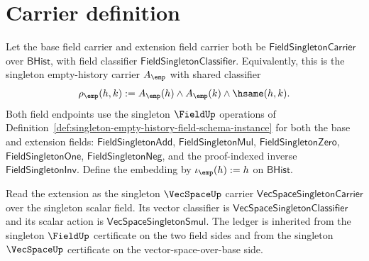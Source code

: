 \section{Carrier definition}
\label{sec:fieldext-carrier}

\begin{definition}
\label{def:fieldext-singleton-empty-history-instance}
Let the base field carrier and extension field carrier both be
$\mathsf{FieldSingletonCarrier}$ over $\mathsf{BHist}$, with field classifier
$\mathsf{FieldSingletonClassifier}$. Equivalently, this is the singleton
empty-history carrier $A_{\emp}$ with shared classifier
$$
\rho_{\emp}(h,k):=
A_{\emp}(h)\land A_{\emp}(k)\land\hsame(h,k).
$$
Both field endpoints use the singleton $\FieldUp$ operations of
Definition~\ref{def:singleton-empty-history-field-schema-instance} for both
the base and extension fields:
$\mathsf{FieldSingletonAdd}$, $\mathsf{FieldSingletonMul}$,
$\mathsf{FieldSingletonZero}$, $\mathsf{FieldSingletonOne}$,
$\mathsf{FieldSingletonNeg}$, and the proof-indexed inverse
$\mathsf{FieldSingletonInv}$. Define the embedding by
$\iota_{\emp}(h):=h$ on $\mathsf{BHist}$.

Read the extension as the singleton $\VecSpaceUp$ carrier
$\mathsf{VecSpaceSingletonCarrier}$ over the singleton scalar field. Its
vector classifier is $\mathsf{VecSpaceSingletonClassifier}$ and its scalar
action is $\mathsf{VecSpaceSingletonSmul}$. The ledger is inherited from the
singleton $\FieldUp$ certificate on the two field sides and from the singleton
$\VecSpaceUp$ certificate on the vector-space-over-base side.


\end{definition}
